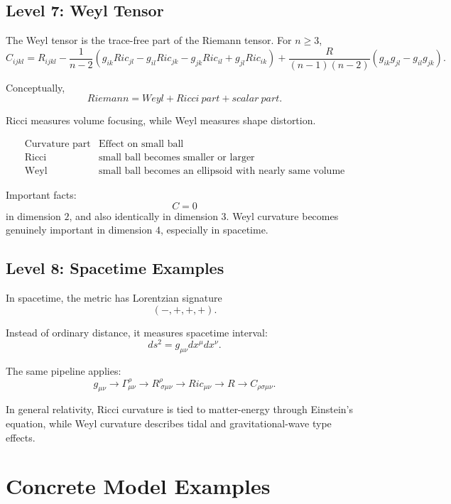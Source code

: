 \documentclass[12pt,a4paper]{article}
\theoremstyle{notespace}
\begin{document}
\subsection{Level 7: Weyl Tensor}

The Weyl tensor is the trace-free part of the Riemann tensor. For \(n\geq 3\),
\[
C_{ijkl}
=
R_{ijkl}
-
\frac{1}{n-2}
\left(
g_{ik}Ric_{jl}
-
g_{il}Ric_{jk}
-
g_{jk}Ric_{il}
+
g_{jl}Ric_{ik}
\right)
+
\frac{R}{(n-1)(n-2)}
\left(
g_{ik}g_{jl}
-
g_{il}g_{jk}
\right).
\]

Conceptually,
\[
\boxed{
	Riemann
	=
	Weyl
	+
	Ricci\ part
	+
	scalar\ part.
}
\]

Ricci measures volume focusing, while Weyl measures shape distortion.

\[
\begin{array}{c|c}
	\text{Curvature part} & \text{Effect on small ball}\\
	\hline
	\text{Ricci} & \text{small ball becomes smaller or larger}\\
	\text{Weyl} & \text{small ball becomes an ellipsoid with nearly same volume}
\end{array}
\]

Important facts:
\[
C=0
\]
in dimension \(2\), and also identically in dimension \(3\). Weyl curvature becomes genuinely important in dimension \(4\), especially in spacetime.

\subsection{Level 8: Spacetime Examples}

In spacetime, the metric has Lorentzian signature
\[
(-,+,+,+).
\]

Instead of ordinary distance, it measures spacetime interval:
\[
ds^2=g_{\mu\nu}dx^\mu dx^\nu.
\]

The same pipeline applies:
\[
g_{\mu\nu}
\longrightarrow
\Gamma^\rho_{\mu\nu}
\longrightarrow
R^\rho_{\ \sigma\mu\nu}
\longrightarrow
Ric_{\mu\nu}
\longrightarrow
R
\longrightarrow
C_{\rho\sigma\mu\nu}.
\]

In general relativity, Ricci curvature is tied to matter-energy through Einstein's equation, while Weyl curvature describes tidal and gravitational-wave type effects.

\section{Concrete Model Examples}
\end{document}
